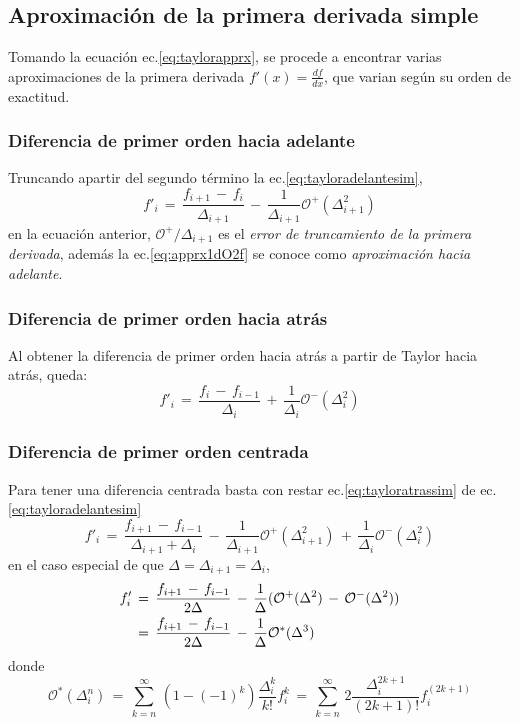 \documentclass[9pt,technote,twoside,letterpaper,twocolumn]{IEEEtran}
\begin{document}
\subsection{Aproximación de la primera derivada simple}
\label{sec:primder}

Tomando la ecuación ec.\ref{eq:taylorapprx}, se procede a encontrar varias aproximaciones de la primera derivada $f'(x)=\frac{df}{dx}$, que varian según su orden de exactitud.

\subsubsection{Diferencia de primer orden hacia adelante}
\label{sec:dif1Da}
Truncando apartir del segundo término la ec.\ref{eq:tayloradelantesim},
\begin{equation}
  f'_i\,=\,\frac{f_{i+1}\,-\,f_i}{\Delta_{i+1}}\,-\,\frac{1}{\Delta_{i+1}}\mathcal{O}^+(\Delta^2_{i+1})
  \label{eq:apprx1dO2f}
\end{equation}
en la ecuación anterior, $\mathcal{O}^+/\Delta_{i+1}$ es el \emph{error de truncamiento de la primera derivada}, además la ec.\ref{eq:apprx1dO2f} se conoce como \emph{aproximación hacia adelante}.

\subsubsection{Diferencia de primer orden hacia atrás}
\label{sec:dif1Db}
Al obtener la diferencia de primer orden hacia atrás a partir de Taylor hacia atrás, queda: 
\begin{equation}
  f'_i\,=\,\frac{f_i\,-\,f_{i-1}}{\Delta_i}\,+\,\frac{1}{\Delta_i}\mathcal{O}^-(\Delta^2_i)
  \label{eq:apprx1dO2b}
\end{equation}

\subsubsection{Diferencia de primer orden centrada}
\label{sec:dif1Dc}
 Para tener una diferencia centrada basta con restar ec.\ref{eq:tayloratrassim} de ec.\ref{eq:tayloradelantesim}
\begin{equation}
  f'_i\,=\,\frac{f_{i+1}\,-\,f_{i-1}}{\Delta_{i+1}+\Delta_i}\,-\,\frac{1}{\Delta_{i+1}}\mathcal{O}^+(\Delta^2_{i+1})\,+\,\frac{1}{\Delta_i}\mathcal{O}^-(\Delta^2_i)
  \label{eq:apprx1dO2c}
\end{equation}
en el caso especial de que $\Delta=\Delta_{i+1}=\Delta_i$,
\begin{align}
  f'_i&\,=\,\frac{f_{i+1}\,-\,f_{i-1}}{2\Delta}\,-\,\frac{1}{\Delta}(\mathcal{O}^+(\Delta^2)\,-\,\mathcal{O}^-(\Delta^2))\notag\\
  &\,=\,\frac{f_{i+1}\,-\,f_{i-1}}{2\Delta}\,-\,\frac{1}{\Delta}\mathcal{O}^*(\Delta^3)
  \label{eq:apprx1dO2cEq}
\end{align}
donde 
\[
\mathcal{O}^*(\Delta^n_{i})\,=\,\sum^\infty_{k=n}\,(1-(-1)^k)\frac{\Delta^k_i}{k!}f^{k}_i\,=\,\sum^\infty_{k=n}\,2\frac{\Delta^{2k+1}_i}{(2k+1)!}f^{(2k+1)}_i
\]
\end{document}

